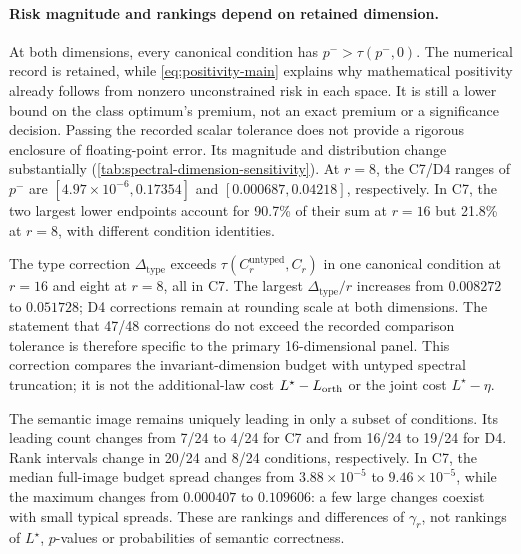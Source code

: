 \paragraph{Risk magnitude and rankings depend on retained dimension.}
At both dimensions, every canonical condition has $p^->\tau(p^-,0)$. The numerical record is retained, while \cref{eq:positivity-main} explains why mathematical positivity already follows from nonzero unconstrained risk in each space. It is still a lower bound on the class optimum's premium, not an exact premium or a significance decision. Passing the recorded scalar tolerance does not provide a rigorous enclosure of floating-point error. Its magnitude and distribution change substantially (\cref{tab:spectral-dimension-sensitivity}). At $r=8$, the C7/D4 ranges of $p^-$ are $[4.97\times10^{-6},0.17354]$ and $[0.000687,0.04218]$, respectively. In C7, the two largest lower endpoints account for 90.7\% of their sum at $r=16$ but 21.8\% at $r=8$, with different condition identities.

The type correction $\Delta_{\mathrm{type}}$ exceeds $\tau(C_r^{\mathrm{untyped}},C_r)$ in one canonical condition at $r=16$ and eight at $r=8$, all in C7. The largest $\Delta_{\mathrm{type}}/r$ increases from $0.008272$ to $0.051728$; D4 corrections remain at rounding scale at both dimensions. The statement that 47/48 corrections do not exceed the recorded comparison tolerance is therefore specific to the primary 16-dimensional panel. This correction compares the invariant-dimension budget with untyped spectral truncation; it is not the additional-law cost $L^\star-L_{\rm orth}$ or the joint cost $L^\star-\eta$.

The semantic image remains uniquely leading in only a subset of conditions. Its leading count changes from 7/24 to 4/24 for C7 and from 16/24 to 19/24 for D4. Rank intervals change in 20/24 and 8/24 conditions, respectively. In C7, the median full-image budget spread changes from $3.88\times10^{-5}$ to $9.46\times10^{-5}$, while the maximum changes from $0.000407$ to $0.109606$: a few large changes coexist with small typical spreads. These are rankings and differences of $\gamma_r$, not rankings of $L^\star$, $p$-values or probabilities of semantic correctness.

